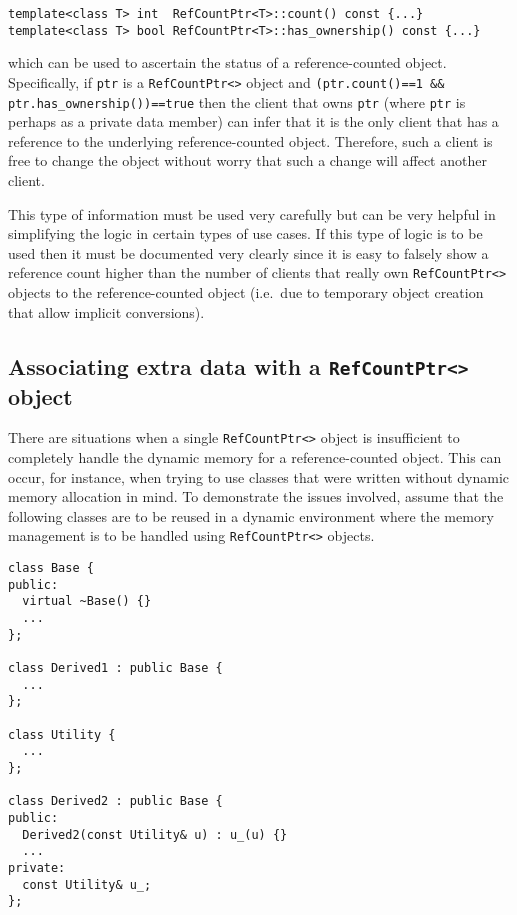 {\scriptsize\begin{verbatim}
template<class T> int  RefCountPtr<T>::count() const {...}
template<class T> bool RefCountPtr<T>::has_ownership() const {...}
\end{verbatim}}

{}\noindent{}which can be used to ascertain the status of a
reference-counted object.  Specifically, if {}\texttt{ptr} is a
{}\texttt{Ref\-Count\-Ptr<>} object and {}\texttt{(ptr.count()==1 \&\&
ptr.has\_ownership())==true} then the client that owns {}\texttt{ptr}
(where {}\texttt{ptr} is perhaps as a private data member) can infer
that it is the only client that has a reference to the underlying
reference-counted object. Therefore, such a client is free to change
the object without worry that such a change will affect another
client.

This type of information must be used very carefully but can be very
helpful in simplifying the logic in certain types of use cases. If
this type of logic is to be used then it must be documented very
clearly since it is easy to falsely show a reference count higher than
the number of clients that really own {}\texttt{Ref\-Count\-Ptr<>}
objects to the reference-counted object (i.e.~due to temporary object
creation that allow implicit conversions).

%
\subsection{Associating extra data with a {}\texttt{Ref\-Count\-Ptr<>} object}
\label{rcp:sec:extra-data}
%

There are situations when a single {}\texttt{Ref\-Count\-Ptr<>} object
is insufficient to completely handle the dynamic memory for a
reference-counted object.  This can occur, for instance, when trying
to use classes that were written without dynamic memory allocation in
mind.  To demonstrate the issues involved, assume that the following
classes are to be reused in a dynamic environment where the memory
management is to be handled using {}\texttt{Ref\-Count\-Ptr<>}
objects.

{\scriptsize\begin{verbatim}
class Base {
public:
  virtual ~Base() {}
  ...
};

class Derived1 : public Base {
  ...
};

class Utility {
  ...
};

class Derived2 : public Base {
public:
  Derived2(const Utility& u) : u_(u) {}
  ...
private:
  const Utility& u_;
};
\end{verbatim}}

